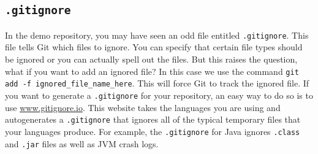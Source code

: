 \documentclass[notitlepage]{simple}
\begin{document}
\subsection{\texttt{.gitignore}}

In the demo repository, you may have seen an odd file entitled \verb|.gitignore|.
This file tells Git which files to ignore.
You can specify that certain file types should be ignored or you can actually spell out the files.
But this raises the question, what if you want to add an ignored file?
In this case we use the command \verb|git add -f ignored_file_name_here|.
This will force Git to track the ignored file.
If you want to generate a \verb|.gitignore| for your repository, an easy way to do so is to use \url{www.gitignore.io}.
This website takes the languages you are using and autogenerates a \verb|.gitignore| that ignores all of the typical temporary files that your languages produce.
For example, the \verb|.gitignore| for Java ignores \verb|.class| and \verb|.jar| files as well as JVM crash logs.
\end{document}
